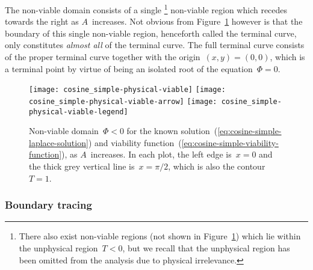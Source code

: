 The non-viable domain consists of a single%
\footnote{
  There also exist non-viable regions
  (not shown in Figure~\ref{fig:cosine_simple-physical-viable})
  which lie within the unphysical region~$T < 0$,
  but we recall that the unphysical region has been omitted from the analysis
  due to physical irrelevance.
}
non-viable region which recedes towards the right as $A$~increases.
Not obvious from Figure~\ref{fig:cosine_simple-physical-viable} however
is that the boundary of this single non-viable region,
henceforth called the  terminal curve,
only constitutes \emph{almost all} of the terminal curve.
The full terminal curve consists of the proper terminal curve
together with the origin~$(x, y) = (0, 0)$,
which is a terminal point
by virtue of being an isolated root of the equation~$\Phi = 0$.

\begin{figure}
  \centering
  \texttt{[image: cosine\_simple-physical-viable]}
  \texttt{[image: cosine\_simple-physical-viable-arrow]}
  \texttt{[image: cosine\_simple-physical-viable-legend]}
  \caption{
    Non-viable domain~$\Phi < 0$
    for the known solution~(\ref{eq:cosine-simple-laplace-solution})
    and viability function~(\ref{eq:cosine-simple-viability-function}),
    as $A$~increases.
    In each plot, the left edge is~$x = 0$
    and the thick grey vertical line is~$x = \pi/2$,
    which is also the contour~$T = 1$.
  }
  \label{fig:cosine_simple-physical-viable}
\end{figure}

\subsubsection{Boundary tracing}
\label{sec:cartesian.cosine.simple.tracing}

